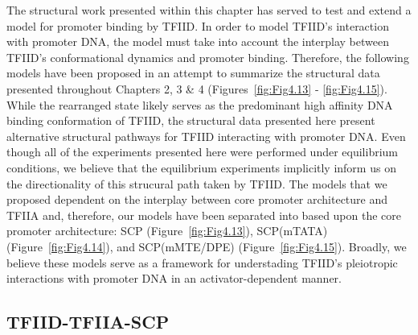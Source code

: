 The structural work presented within this chapter has served to test and extend a model for promoter binding by TFIID. In order to model TFIID's interaction with promoter DNA, the model must take into account the interplay between TFIID's conformational dynamics and promoter binding. Therefore, the following models have been proposed in an attempt to summarize the structural data presented throughout Chapters 2, 3 \& 4 (Figures~\ref{fig:Fig4.13} - \ref{fig:Fig4.15}). While the rearranged state likely serves as the predominant high affinity DNA binding conformation of TFIID, the structural data presented here present alternative structural pathways for TFIID interacting with promoter DNA. Even though all of the experiments presented here were performed under equilibrium conditions, we believe that the equilibrium experiments implicitly inform us on the directionality of this strucural path taken by TFIID. The models that we proposed dependent on the interplay between core promoter architecture and TFIIA and, therefore, our models have been separated into based upon the core promoter architecture: SCP (Figure~\ref{fig:Fig4.13}), SCP(mTATA) (Figure~\ref{fig:Fig4.14}), and SCP(mMTE/DPE) (Figure~\ref{fig:Fig4.15}). Broadly, we believe these models serve as a framework for understading TFIID's pleiotropic interactions with promoter DNA in an activator-dependent manner.\\

\subsection{TFIID-TFIIA-SCP}

